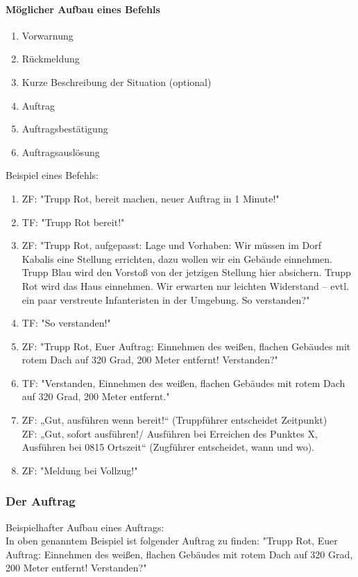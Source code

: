 \paragraph*{Möglicher Aufbau eines Befehls}
\begin{enumerate}
	\item Vorwarnung
	\item Rückmeldung
	\item Kurze Beschreibung der Situation (optional)
	\item Auftrag
	\item Auftragsbestätigung
	\item Auftragsauslösung
\end{enumerate}

Beispiel eines Befehls:
\begin{enumerate}
	\item ZF: "Trupp Rot, bereit machen, neuer Auftrag in 1 Minute!"
	\item TF: "Trupp Rot bereit!"
	\item ZF: "Trupp Rot, aufgepasst: Lage und Vorhaben: Wir müssen im Dorf Kabalis eine Stellung errichten, dazu wollen wir ein Gebäude einnehmen. Trupp Blau wird den Vorstoß von der jetzigen Stellung hier absichern. Trupp Rot wird das Haus einnehmen. Wir erwarten nur leichten Widerstand -- evtl. ein paar verstreute Infanteristen in der Umgebung. So verstanden?"
	\item TF: "So verstanden!"
	\item ZF: "Trupp Rot, Euer Auftrag: Einnehmen des weißen, flachen Gebäudes mit rotem Dach auf 320 Grad, 200 Meter entfernt! Verstanden?"
	\item TF: "Verstanden, Einnehmen des weißen, flachen Gebäudes mit rotem Dach auf 320 Grad, 200 Meter entfernt."
	\item ZF: „Gut, ausführen wenn bereit!“ (Truppführer entscheidet Zeitpunkt)\\ 
		ZF: „Gut, sofort ausführen!/ Ausführen bei Erreichen des Punktes X, Ausführen bei 0815 Ortszeit“ (Zugführer entscheidet, wann und wo).
	\item ZF: "Meldung bei Vollzug!"
\end{enumerate}

\subsubsection{Der Auftrag}
Beispielhafter Aufbau eines Auftrags:\\

In oben genanntem Beispiel ist folgender Auftrag zu finden:
"Trupp Rot, Euer Auftrag: Einnehmen des weißen, flachen Gebäudes mit rotem Dach auf 320 Grad, 200 Meter entfernt! Verstanden?"

